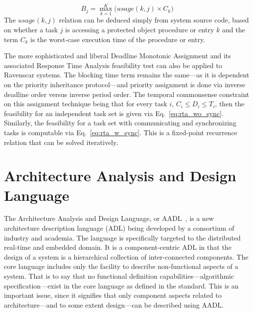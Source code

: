 \begin{displaymath}
B_j = \max_{k=1}^{K} \Big(usage(k,j)\times C_k\Big)
\end{displaymath}
\noindent
The $usage(k,j)$ relation can be deduced simply from system source
code, based on whether a task $j$ is accessing a protected object
procedure or entry $k$ and the term $C_k$ is the worst-case execution
time of the procedure or entry.

The more sophisticated and liberal Deadline Monotonic Assignment and
its associated Response Time Analysis feasibility test can also be
applied to Ravenscar systems. The blocking time term remains the
same---as it is dependent on the priority inheritance protocol---and
priority assignment is done via inverse deadline order versus inverse
period order. The temporal commonsense constraint on this assignment
technique being that for every task $i$, $C_i \le D_i \le T_i$, then
the feasibility for an independent task set is given via
Eq.~\ref{eq:rta_wo_sync}. Similarly, the feasibility for a task set
with communicating and synchronizing tasks is computable via
Eq.~\ref{eq:rta_w_sync}. This is a fixed-point recurrence relation
that can be solved iteratively.

\section{Architecture Analysis and Design Language}
The Architecture Analysis and Design Language, or AADL~\cite{AS5506},
is a new architecture description language (ADL) being developed by a
consortium of industry and academia. The language is specifically
targeted to the distributed real-time and embedded domain. It is a
component-centric ADL in that the design of a system is a hierarchical
collection of inter-connected components. The core language includes
only the facility to describe non-functional aspects of a system. That
is to say that no functional definition capabilities---algorithmic
specification---exist in the core language as defined in the
standard. This is an important issue, since it signifies that only
component aspects related to architecture---and to some extent
design---can be described using AADL.

